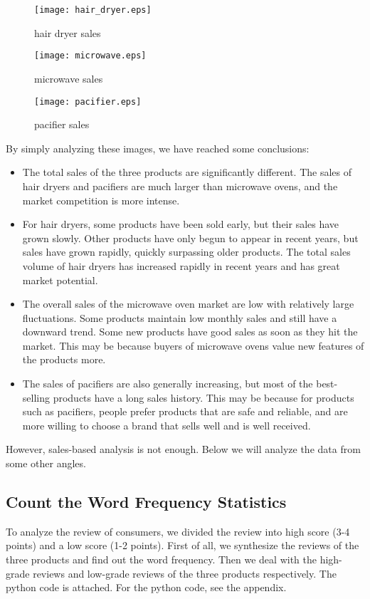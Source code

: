 \documentclass{mcmthesis}
\begin{document}
	\begin{figure}[H]
		\small
		\centering
		\texttt{[image: hair\_dryer.eps]}
		\caption{hair dryer sales} \label{hair dryer sales}
	\end{figure}
	
	\begin{figure}[H]
		\small
		\centering
		\texttt{[image: microwave.eps]}
		\caption{microwave sales} \label{microwave sales}
	\end{figure}
	
	\begin{figure}[H]
		\small
		\centering
		\texttt{[image: pacifier.eps]}
		\caption{pacifier sales} \label{pacifier sales}
	\end{figure}
	
	By simply analyzing these images, we have reached some conclusions:
	\begin{itemize}
		\item
		The total sales of the three products are significantly different. The sales of hair dryers and pacifiers are much larger than microwave ovens, and the market competition is more intense.
		\item
		For hair dryers, some products have been sold early, but their sales have grown slowly. Other products have only begun to appear in recent years, but sales have grown rapidly, quickly surpassing older products. The total sales volume of hair dryers has increased rapidly in recent years and has great market potential.
		\item
		The overall sales of the microwave oven market are low with relatively large fluctuations. Some products maintain low monthly sales and still have a downward trend. Some new products have good sales as soon as they hit the market. This may be because buyers of microwave ovens value new features of the products more.
		\item
		The sales of pacifiers are also generally increasing, but most of the best-selling products have a long sales history. This may be because for products such as pacifiers, people prefer products that are safe and reliable, and are more willing to choose a brand that sells well and is well received.
	\end{itemize}
	
	However, sales-based analysis is not enough. Below we will analyze the data from some other angles.
	
	\subsection{Count the Word Frequency Statistics}
	To analyze the review of consumers, we divided the review into high score (3-4 points) and a low score (1-2 points). First of all, we synthesize the reviews of the three products and find out the word frequency. Then we deal with the high-grade reviews and low-grade reviews of the three products respectively. The python code is attached. For the python code, see the appendix.
\end{document}
